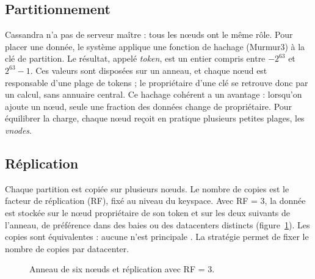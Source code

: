 \documentclass[11pt,a4paper]{article}
\newcommand{\cq}[1]{\texttt{\detokenize{#1}}}
\begin{document}
\subsection{Partitionnement}
Cassandra n'a pas de serveur maître : tous les nœuds ont le même rôle. Pour placer une donnée, le système applique une fonction de hachage (Murmur3) à la clé de partition. Le résultat, appelé \emph{token}, est un entier compris entre $-2^{63}$ et $2^{63}-1$. Ces valeurs sont disposées sur un anneau, et chaque nœud est responsable d'une plage de tokens ; le propriétaire d'une clé se retrouve donc par un calcul, sans annuaire central. Ce hachage cohérent a un avantage : lorsqu'on ajoute un nœud, seule une fraction des données change de propriétaire. Pour équilibrer la charge, chaque nœud reçoit en pratique plusieurs petites plages, les \emph{vnodes}.

\subsection{Réplication}
Chaque partition est copiée sur plusieurs nœuds. Le nombre de copies est le facteur de réplication (RF), fixé au niveau du keyspace. Avec RF = 3, la donnée est stockée sur le nœud propriétaire de son token et sur les deux suivants de l'anneau, de préférence dans des baies ou des datacenters distincts (figure~\ref{fig:ring}). Les copies sont équivalentes : aucune n'est \og principale \fg{}. La stratégie \cq{NetworkTopologyStrategy} permet de fixer le nombre de copies par datacenter.

\begin{figure}[ht]
\centering
{}
\caption{Anneau de six nœuds et réplication avec RF = 3.}
\label{fig:ring}
\end{figure}
\end{document}
